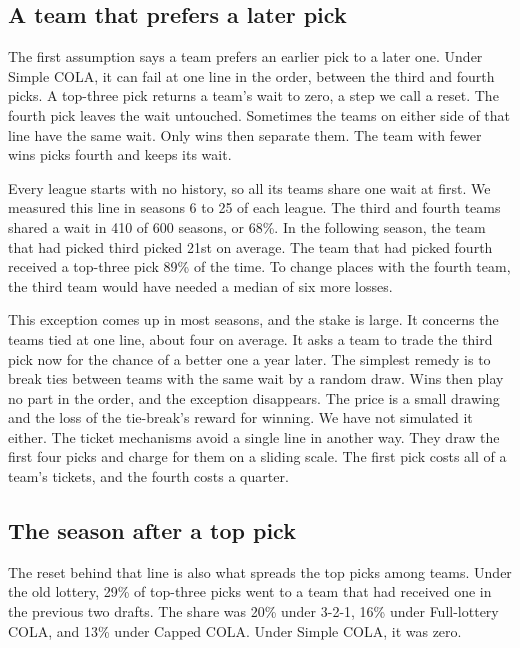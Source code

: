 \documentclass[11pt,letterpaper]{article}
\begin{document}
\subsection{A team that prefers a later pick}

The first assumption says a team prefers an earlier pick to a later one. Under Simple COLA, it can fail at one line in the order, between the third and fourth picks. A top-three pick returns a team's wait to zero, a step we call a reset. The fourth pick leaves the wait untouched. Sometimes the teams on either side of that line have the same wait. Only wins then separate them. The team with fewer wins picks fourth and keeps its wait.

Every league starts with no history, so all its teams share one wait at first. We measured this line in seasons 6 to 25 of each league. The third and fourth teams shared a wait in 410 of 600 seasons, or 68\%. In the following season, the team that had picked third picked 21st on average. The team that had picked fourth received a top-three pick 89\% of the time. To change places with the fourth team, the third team would have needed a median of six more losses.

This exception comes up in most seasons, and the stake is large. It concerns the teams tied at one line, about four on average. It asks a team to trade the third pick now for the chance of a better one a year later. The simplest remedy is to break ties between teams with the same wait by a random draw. Wins then play no part in the order, and the exception disappears. The price is a small drawing and the loss of the tie-break's reward for winning. We have not simulated it either. The ticket mechanisms avoid a single line in another way. They draw the first four picks and charge for them on a sliding scale. The first pick costs all of a team's tickets, and the fourth costs a quarter.

\subsection{The season after a top pick}

The reset behind that line is also what spreads the top picks among teams. Under the old lottery, 29\% of top-three picks went to a team that had received one in the previous two drafts. The share was 20\% under 3-2-1, 16\% under Full-lottery COLA, and 13\% under Capped COLA. Under Simple COLA, it was zero.
\end{document}
